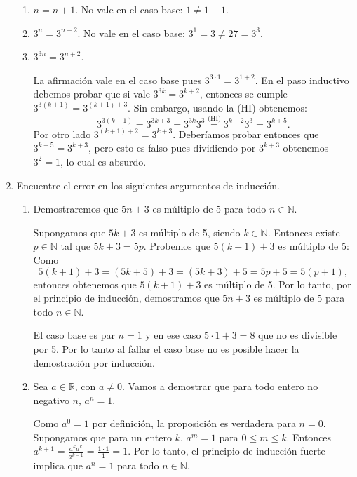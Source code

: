 \begin{enumerate}
\begin{enumerate}
            \item  $n=n+1$. No vale en el caso base: $1 \ne 1+1$.
            \item  $3^n = 3^{n+2}$.  No vale en el caso base: $3^1 = 3 \ne 27 = 3^3$.
            \item  $3^{3n} = 3^{n+2}$.  
            
            \rta La afirmación vale en el caso base pues  $3^{3\cdot 1} = 3^{1+2}$. En el paso inductivo debemos probar que si  vale $3^{3k} = 3^{k+2}$, entonces se cumple $3^{3(k+1)} = 3^{(k+1)+3}$. Sin embargo, usando  la (HI) obtenemos:
            \begin{equation*}
            3^{3(k+1)}  = 3^{3k+3} = 3^{3k}3^3\overset{\text{(HI)}}{=} 3^{k+2}3^3 = 3^{k+5}.
            \end{equation*}
            Por otro  lado $3^{(k+1)+2} = 3^{k+3}$. Deberíamos probar entonces que $3^{k+5} = 3^{k+3}$, pero esto es falso pues dividiendo  por $3^{k+3}$ obtenemos $3^2 =1$,  lo cual es absurdo.
    \end{enumerate}
    
   
    \item Encuentre el error en los siguientes argumentos de inducción.
    \begin{enumerate}
        \item  Demostraremos que $5n+3$ es múltiplo de 5 para todo $n\in \mathbb N$.
        
        Supongamos que $5k+3$ es múltiplo de 5, siendo $k\in \mathbb N$. Entonces existe
        $p\in \mathbb N$ tal que  $5k+3=5p$. Probemos que $5(k+1)+3$ es múltiplo de 5:
        Como
        $$
        5(k+1)+3=(5k+5)+3=(5k+3)+5=5p+5=5(p+1),
        $$
        entonces obtenemos que $5(k+1)+3$ es múltiplo de 5. Por lo tanto, por el principio
        de inducción, demostramos que $5n+3$ es múltiplo de 5 para todo $n\in \mathbb
        N$.
        
        \rta El caso base es par $n=1$ y en ese caso $5\cdot 1+3=8$ que no es divisible por 5. Por lo tanto al fallar el caso base no es posible hacer la demostración por inducción. 
        
       
        \item Sea $a\in\mathbb R$, con $a\neq 0$. Vamos a demostrar que para todo entero no negativo $n$, $a^n=1$.
        
        Como $a^0=1$ por definición, la proposición es verdadera para $n=0$. Supongamos
        que para  un entero $k$, $a^m=1$ para $0\leq m \leq k$. Entonces
        $a^{k+1}= \frac{a^k a^k}{a^{k-1}}=\frac{1\cdot1}1=1$.
        Por lo tanto, el principio de inducción fuerte implica que $a^n=1$ para todo $n\in \mathbb N$.
        

\end{enumerate}
\end{enumerate}
